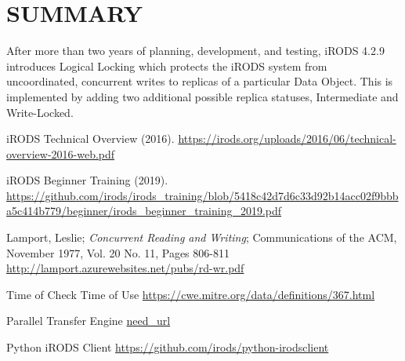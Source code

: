 \documentclass{irodsugm}
\begin{document}
\section*{SUMMARY}

After more than two years of planning, development, and testing, iRODS 4.2.9 introduces Logical Locking which protects the iRODS system from uncoordinated, concurrent writes to replicas of a particular Data Object.  This is implemented by adding two additional possible replica statuses, Intermediate and Write-Locked.

\begin{thebibliography}{5}

iRODS Technical Overview (2016). \url{https://irods.org/uploads/2016/06/technical-overview-2016-web.pdf}

iRODS Beginner Training (2019). \url{https://github.com/irods/irods_training/blob/5418c42d7d6c33d92b14acc02f9bbba5c414b779/beginner/irods_beginner_training_2019.pdf}

Lamport, Leslie; \textit{Concurrent Reading and Writing}; Communications of the ACM, November 1977, Vol. 20 No. 11, Pages 806-811 \url{http://lamport.azurewebsites.net/pubs/rd-wr.pdf}

Time of Check Time of Use \url{https://cwe.mitre.org/data/definitions/367.html}

Parallel Transfer Engine \url{need_url}

Python iRODS Client \url{https://github.com/irods/python-irodsclient}


\end{thebibliography}
\end{document}
